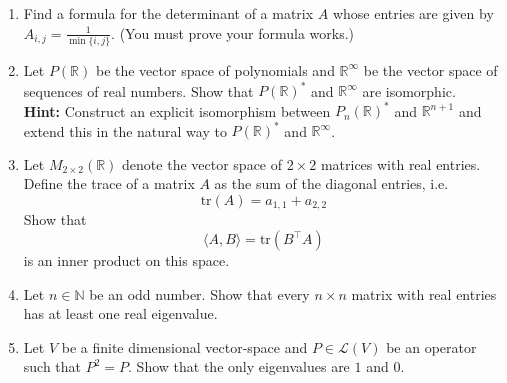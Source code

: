 \documentclass[12pt,letterpaper]{article}
\newcommand{\tr}{\text{tr}}
\theoremstyle{plain}
\theoremstyle{definition}
\begin{document}
\begin{enumerate}[{\bf1.}]

\item Find a formula for the determinant of a matrix $A$ whose entries are given by $A_{i,j}=\frac{1}{\min\{i,j\}}$. (You must prove your formula works.)

\item Let $P(\mathbb{R})$ be the vector space of polynomials and $\mathbb{R}^\infty$ be the vector space of sequences of real numbers. Show that $P(\mathbb{R})^*$ and $\mathbb{R}^\infty$ are isomorphic. \vspace{-.1in}\\

{\bf Hint: }Construct an explicit isomorphism between $P_n(\mathbb{R})^*$ and $\mathbb{R}^{n+1}$ and extend this in the natural way to $P(\mathbb{R})^*$ and $\mathbb{R}^\infty$. 

\item Let $M_{2\times 2}(\mathbb{R})$ denote the vector space of $2\times 2$ matrices with real entries.  Define the trace of a matrix $A$  as the sum of the diagonal entries, i.e. 
\[\tr(A)=a_{1,1}+a_{2,2}\]
Show that 
\[\langle A, B\rangle=\tr(B^\top A)\]
is an inner product on this space. 

\item Let $n\in \mathbb{N}$ be an odd number. Show that every $n\times n$ matrix with real entries has at least one real eigenvalue. \\

\item Let $V$ be a finite dimensional vector-space and $P\in \mathcal{L}(V)$ be an operator such that $P^2=P$. Show that the only eigenvalues are $1$ and $0$. 


\end{enumerate}
\end{document}
